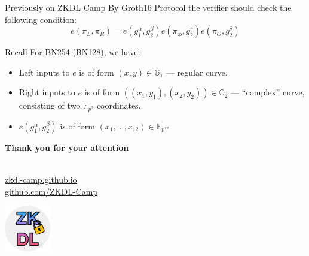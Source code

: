 \documentclass{zkdl-presentation-template}
\begin{document}
    \begin{frame}{Previously on ZKDL Camp}
        By Groth16 Protocol the verifier \pause should check the following condition:
        \begin{equation*}
            e(\pi_L, \pi_R) = e(g_1^{\alpha}, g_2^{\beta})e(\pi_{\text{io}},g_2^{\gamma})e(\pi_O,g_2^{\delta})
        \end{equation*}

        \pause

        \begin{alertblock}{Recall}
            For BN254 (BN128), we have:
            \begin{itemize}
                \item Left inputs to $e$ is of form $(x,y) \in \mathbb{G}_1$ --- regular curve.
                \item Right inputs to $e$ is of form $((x_1,y_1),(x_2,y_2)) \in \mathbb{G}_2$ --- ``complex'' curve, consisting of two $\mathbb{F}_{p^2}$ coordinates.
                \item $e(g_1^{\alpha}, g_2^{\beta})$ is of form $(x_1,\dots,x_{12}) \in \mathbb{F}_{p^{12}}$
            \end{itemize}
        \end{alertblock}
    \end{frame}

    \begin{frame}
        \centering
        \LARGE
        \textbf{Thank you for your attention} \\

        \vspace{0.2cm} \Huge {} \large \\

        \vspace{1cm}

        \href{https://zkdl-camp.github.io/}{\hspace{.325em}zkdl-camp.github.io} \\

        \href{https://github.com/ZKDL-Camp}{\hspace{.325em}github.com/ZKDL-Camp}

        \begin{center}
            \includegraphics[width=0.15\textwidth]{images/logo.png}
        \end{center}
    \end{frame}
\end{document}
